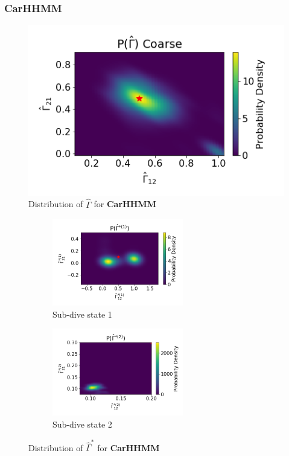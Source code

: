 \documentclass[12pt]{TD-CJS}
\begin{document}

\subsubsection{CarHHMM}

\begin{figure}
    \centering
    \includegraphics[width=5in]{../Plots/hhmm_V_Gamma_density_-1.png}
    \caption{Distribution of $\hat \Gamma$ for \textbf{CarHHMM}}
\end{figure}

\begin{figure}[ht]
	\centering
	\begin{subfigure}[t]{0.45\textwidth}
        \centering
        \includegraphics[width=2.25in]{../Plots/hhmm_V_Gamma_density_0.png}
        \caption{Sub-dive state 1}
    \end{subfigure}
    \begin{subfigure}[t]{0.45\textwidth}
        \centering
        \includegraphics[width=2.25in]{../Plots/hhmm_V_Gamma_density_1.png}
        \caption{Sub-dive state 2}
    \end{subfigure}
    \caption{Distribution of $\hat \Gamma^{*}$ for \textbf{CarHHMM}}
\end{figure}
\end{document}
